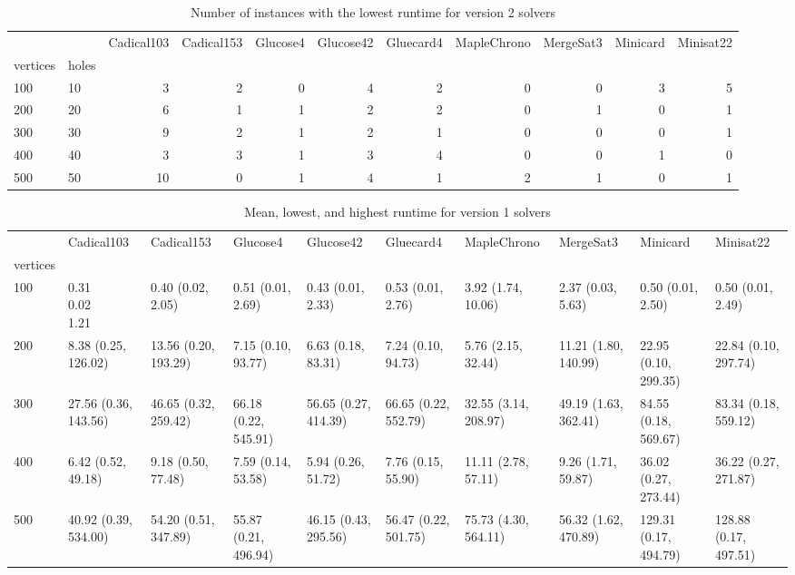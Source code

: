 \begin{table}[htbp]
\tiny
\centering
\begin{tabular}{llrrrrrrrrr}
\toprule
 & & Cadical103 & Cadical153 & Glucose4 & Glucose42 & Gluecard4 & MapleChrono & MergeSat3 & Minicard & Minisat22 \\
vertices & holes &  &  &  &  &  &  &  &  &  \\
\midrule
100 & 10 & 3 & 2 & 0 & 4 & 2 & 0 & 0 & 3 & 5 \\
\cline{1-11}
200 & 20 & 6 & 1 & 1 & 2 & 2 & 0 & 1 & 0 & 1 \\
\cline{1-11}
300 & 30 & 9 & 2 & 1 & 2 & 1 & 0 & 0 & 0 & 1 \\
\cline{1-11}
400 & 40 & 3 & 3 & 1 & 3 & 4 & 0 & 0 & 1 & 0 \\
\cline{1-11}
500 & 50 & 10 & 0 & 1 & 4 & 1 & 2 & 1 & 0 & 1 \\
\cline{1-11}
\bottomrule
\end{tabular}
\caption{Number of instances with the lowest runtime for version 2 solvers}
\label{tab:SAT_small_time_v2}
\end{table}

\begin{table}[htbp]
\tiny
\centering
\begin{tabular}{llllllllll}
\toprule
 & Cadical103 & Cadical153 & Glucose4 & Glucose42 & Gluecard4 & MapleChrono & MergeSat3 & Minicard & Minisat22 \\
vertices &  &  &  &  &  &  &  &  &  \\
\midrule
100 & \makecell{0.31\\0.02\\1.21} & 0.40 (0.02, 2.05) & 0.51 (0.01, 2.69) & 0.43 (0.01, 2.33) & 0.53 (0.01, 2.76) & 3.92 (1.74, 10.06) & 2.37 (0.03, 5.63) & 0.50 (0.01, 2.50) & 0.50 (0.01, 2.49) \\
200 & 8.38 (0.25, 126.02) & 13.56 (0.20, 193.29) & 7.15 (0.10, 93.77) & 6.63 (0.18, 83.31) & 7.24 (0.10, 94.73) & 5.76 (2.15, 32.44) & 11.21 (1.80, 140.99) & 22.95 (0.10, 299.35) & 22.84 (0.10, 297.74) \\
300 & 27.56 (0.36, 143.56) & 46.65 (0.32, 259.42) & 66.18 (0.22, 545.91) & 56.65 (0.27, 414.39) & 66.65 (0.22, 552.79) & 32.55 (3.14, 208.97) & 49.19 (1.63, 362.41) & 84.55 (0.18, 569.67) & 83.34 (0.18, 559.12) \\
400 & 6.42 (0.52, 49.18) & 9.18 (0.50, 77.48) & 7.59 (0.14, 53.58) & 5.94 (0.26, 51.72) & 7.76 (0.15, 55.90) & 11.11 (2.78, 57.11) & 9.26 (1.71, 59.87) & 36.02 (0.27, 273.44) & 36.22 (0.27, 271.87) \\
500 & 40.92 (0.39, 534.00) & 54.20 (0.51, 347.89) & 55.87 (0.21, 496.94) & 46.15 (0.43, 295.56) & 56.47 (0.22, 501.75) & 75.73 (4.30, 564.11) & 56.32 (1.62, 470.89) & 129.31 (0.17, 494.79) & 128.88 (0.17, 497.51) \\
\bottomrule
\end{tabular}
\caption{Mean, lowest, and highest runtime for version 1 solvers}
\label{tab:my_label}
\end{table}

